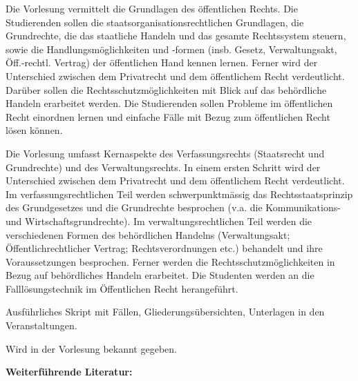 \begin{course}
\begin{learningoutcomes}
Die Vorlesung vermittelt die Grundlagen des öffentlichen Rechts. Die Studierenden sollen die staatsorganisationsrechtlichen\newline
Grundlagen, die Grundrechte, die das staatliche Handeln und das gesamte Rechtssystem steuern, sowie die Handlungsmöglichkeiten und -formen (insb. Gesetz, Verwaltungsakt, Öff.-rechtl. Vertrag) der öffentlichen Hand kennen\newline
lernen. Ferner wird der Unterschied zwischen dem Privatrecht und dem öffentlichem Recht verdeutlicht. Darüber sollen\newline
die Rechtsschutzmöglichkeiten mit Blick auf das behördliche Handeln erarbeitet werden. Die Studierenden sollen\newline
Probleme im öffentlichen Recht einordnen lernen und einfache Fälle mit Bezug zum öffentlichen Recht lösen können.


\end{learningoutcomes}

\begin{content}
Die Vorlesung umfasst Kernaspekte des Verfassungsrechts (Staatsrecht und Grundrechte) und des Verwaltungsrechts. In einem ersten Schritt wird der Unterschied zwischen dem Privatrecht und dem öffentlichem Recht verdeutlicht. Im verfassungsrechtlichen Teil werden schwerpunktmässig das Rechtsstaatsprinzip des Grundgesetzes und die Grundrechte besprochen (v.a. die Kommunikations- und Wirtschaftsgrundrechte). Im verwaltungsrechtlichen Teil werden die verschiedenen Formen des behördlichen Handelns (Verwaltungsakt; Öffentlichrechtlicher Vertrag; Rechtsverordnungen etc.) behandelt und ihre Voraussetzungen besprochen. Ferner werden die Rechtsschutzmöglichkeiten in Bezug auf behördliches Handeln erarbeitet. Die Studenten werden an die Falllösungstechnik im Öffentlichen Recht herangeführt.


\end{content}

\begin{media}Ausführliches Skript mit Fällen, Gliederungsübersichten, Unterlagen in den Veranstaltungen.

\end{media}

\begin{literature}Wird in der Vorlesung bekannt gegeben.

 

\textbf{Weiterführende Literatur:}


\end{literature}
\end{course}
